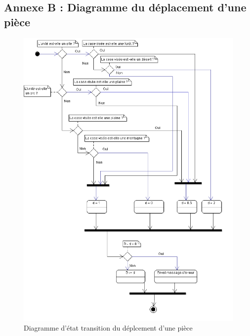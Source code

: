 \subsection{Annexe B : Diagramme du déplacement d'une pièce}
\begin{figure}[!h]
\centering
\includegraphics[scale=0.7]{img/Deplacement.png}
\caption{Diagramme d'état transition du déplcement d'une pièce}
\end{figure}
\clearpage

